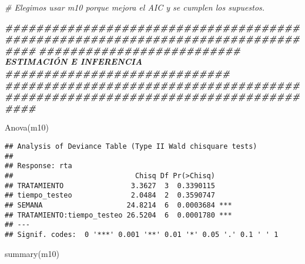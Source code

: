 \documentclass[
]{article}
\newenvironment{Shaded}{\begin{snugshade}}{\end{snugshade}}
\newcommand{\CommentTok}[1]{\textcolor[rgb]{0.56,0.35,0.01}{\textit{#1}}}
\newcommand{\DocumentationTok}[1]{\textcolor[rgb]{0.56,0.35,0.01}{\textbf{\textit{#1}}}}
\newcommand{\FunctionTok}[1]{\textcolor[rgb]{0.00,0.00,0.00}{#1}}
\newcommand{\NormalTok}[1]{#1}
\begin{document}
\begin{Shaded}
\begin{Highlighting}[]
\CommentTok{\# Elegimos usar m10 porque mejora el AIC y se cumplen los supuestos.}
    
\DocumentationTok{\#\#\#\#\#\#\#\#\#\#\#\#\#\#\#\#\#\#\#\#\#\#\#\#\#\#\#\#\#\#\#\#\#\#\#\#\#\#\#\#\#\#\#\#\#\#\#\#\#\#\#\#\#\#\#\#\#\#\#\#\#\#\#\#\#\#\#\#\#\#\#\#\#\#\#\#\#\#\#\#}
\DocumentationTok{\#\#\#\#\#\#\#\#\#\#\#\#\#\#\#\#\#\#\#\#\#\#\#\#\#\# ESTIMACIÓN E INFERENCIA \#\#\#\#\#\#\#\#\#\#\#\#\#\#\#\#\#\#\#\#\#\#\#\#\#\#\#\#\#}
\DocumentationTok{\#\#\#\#\#\#\#\#\#\#\#\#\#\#\#\#\#\#\#\#\#\#\#\#\#\#\#\#\#\#\#\#\#\#\#\#\#\#\#\#\#\#\#\#\#\#\#\#\#\#\#\#\#\#\#\#\#\#\#\#\#\#\#\#\#\#\#\#\#\#\#\#\#\#\#\#\#\#\#\#}

\FunctionTok{Anova}\NormalTok{(m10)}
\end{Highlighting}
\end{Shaded}

\begin{verbatim}
## Analysis of Deviance Table (Type II Wald chisquare tests)
## 
## Response: rta
##                             Chisq Df Pr(>Chisq)    
## TRATAMIENTO                3.3627  3  0.3390115    
## tiempo_testeo              2.0484  2  0.3590747    
## SEMANA                    24.8214  6  0.0003684 ***
## TRATAMIENTO:tiempo_testeo 26.5204  6  0.0001780 ***
## ---
## Signif. codes:  0 '***' 0.001 '**' 0.01 '*' 0.05 '.' 0.1 ' ' 1
\end{verbatim}

\begin{Shaded}
\begin{Highlighting}[]
\FunctionTok{summary}\NormalTok{(m10)}
\end{Highlighting}
\end{Shaded}
\end{document}
